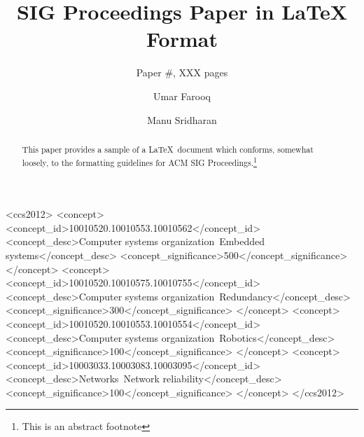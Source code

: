 \documentclass[10pt,sigconf,anonymous]{acmart}
\newenvironment{DIFnomarkup}{}{}
\begin{document}
\title{SIG Proceedings Paper in LaTeX Format}
\subtitle{Paper \#, XXX pages}


\author{Umar Farooq}
  
\author{Manu Sridharan}


\renewcommand{\shortauthors}{F. Lastname et al.}


\begin{abstract}
This paper provides a sample of a \LaTeX\ document which conforms,
somewhat loosely, to the formatting guidelines for
ACM SIG Proceedings.\footnote{This is an abstract footnote}
\end{abstract}

\begin{DIFnomarkup}
\begin{CCSXML}
<ccs2012>
 <concept>
  <concept_id>10010520.10010553.10010562</concept_id>
  <concept_desc>Computer systems organization~Embedded systems</concept_desc>
  <concept_significance>500</concept_significance>
 </concept>
 <concept>
  <concept_id>10010520.10010575.10010755</concept_id>
  <concept_desc>Computer systems organization~Redundancy</concept_desc>
  <concept_significance>300</concept_significance>
 </concept>
 <concept>
  <concept_id>10010520.10010553.10010554</concept_id>
  <concept_desc>Computer systems organization~Robotics</concept_desc>
  <concept_significance>100</concept_significance>
 </concept>
 <concept>
  <concept_id>10003033.10003083.10003095</concept_id>
  <concept_desc>Networks~Network reliability</concept_desc>
  <concept_significance>100</concept_significance>
 </concept>
</ccs2012>  
\end{CCSXML}

\end{DIFnomarkup}




\maketitle
\end{document}
